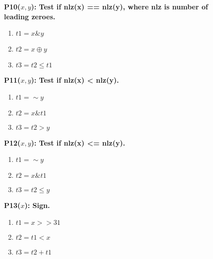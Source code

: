 \documentclass[a4paper]{llncs}
\begin{document}
\begin{figure}
\begin{multicols}{4}
      \vspace{12pt}
   
   \begin{minipage}{.2\textwidth}
   \bf{P10}($x, y$): Test if nlz(x) == nlz(y), where nlz is number of leading zeroes.
   \begin{enumerate}
    \item $t1 = x \& y$
    \item $t2 = x \oplus y$
    \item $t3 = t2 \leq t1$
   \end{enumerate}
   \end{minipage}

   
      \vspace{12pt}
   
   \begin{minipage}{.2\textwidth}
   \bf{P11}($x, y$): Test if nlz(x) < nlz(y).
   \begin{enumerate}
    \item $t1 = \sim y$
    \item $t2 = x \& t1$
    \item $t3 = t2 > y$
   \end{enumerate}
   \end{minipage}
   \vspace{12pt}
   
   \begin{minipage}{.2\textwidth}
   \bf{P12}($x, y$): Test if nlz(x) <= nlz(y).
   \begin{enumerate}
    \item $t1 = \sim y$
    \item $t2 = x \& t1$
    \item $t3 = t2 \leq y$
   \end{enumerate}
   \end{minipage}
   
      \vspace{12pt}
   
   \begin{minipage}{.2\textwidth}
   \bf{P13}($x$): Sign.
   \begin{enumerate}
    \item $t1 = x >> 31$
    \item $t2 = t1 < x$
    \item $t3 = t2 + t1$
   \end{enumerate}
   \end{minipage}

   \vspace{12pt}


\end{multicols}
\end{figure}
\end{document}
